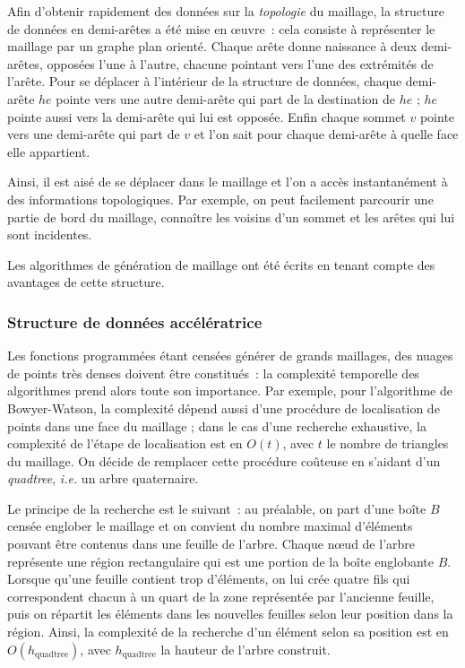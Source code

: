 \documentclass[12pt,a4paper]{report}
\begin{document}
Afin d'obtenir rapidement des données sur la \emph{topologie} du maillage, la structure de données en demi-arêtes a été mise en \oe{}uvre~: cela consiste à représenter le maillage par un graphe plan orienté. Chaque arête donne naissance à deux demi-arêtes, opposées l'une à l'autre, chacune pointant vers l'une des extrémités de l'arête. Pour se déplacer à l'intérieur de la structure de données, chaque demi-arête $he$ pointe vers une autre demi-arête qui part de la destination de $he$ ; $he$ pointe aussi vers la demi-arête qui lui est opposée. Enfin chaque sommet $v$ pointe vers une demi-arête qui part de $v$ et l'on sait pour chaque demi-arête à quelle face elle appartient.

Ainsi, il est aisé de se déplacer dans le maillage et l'on a accès instantanément à des informations topologiques. Par exemple, on peut facilement parcourir une partie de bord du maillage, connaître les voisins d'un sommet et les arêtes qui lui sont incidentes.

Les algorithmes de génération de maillage ont été écrits en tenant compte des avantages de cette structure.



\subsubsection{Structure de données accélératrice}

Les fonctions programmées étant censées générer de \og grands \fg{} maillages, des nuages de points très denses doivent être constitués~: la  complexité temporelle des algorithmes prend alors toute son importance. Par exemple, pour l'algorithme de Bowyer-Watson, la complexité dépend aussi d'une procédure de localisation de points dans une face du maillage ; dans le cas d'une recherche exhaustive, la complexité de l'étape de localisation est en $O(t)$, avec $t$ le nombre de triangles du maillage. On décide de remplacer cette procédure coûteuse en s'aidant d'un \emph{quadtree}, \emph{i.e.} un arbre quaternaire.

Le principe de la recherche est le suivant~: au préalable, on part d'une boîte $B$ censée englober le maillage et on convient du nombre maximal d'éléments pouvant être contenus dans une feuille de l'arbre. Chaque n\oe{}ud de l'arbre représente une région rectangulaire qui est une portion de la boîte englobante $B$. Lorsque qu'une feuille contient trop d'éléments, on lui crée quatre fils qui correspondent chacun à un quart de la zone représentée par l'ancienne feuille, puis on répartit les éléments dans les nouvelles feuilles selon leur position dans la région. Ainsi, la complexité de la recherche d'un élément selon sa position est en $O(h_{\text{quadtree}})$, avec $h_{\text{quadtree}}$ la hauteur de l'arbre construit.
\end{document}
